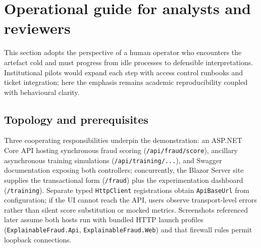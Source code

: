 \begin{table}[htbp]
\centering
{\footnotesize\setlength{\tabcolsep}{4pt}\renewcommand{\arraystretch}{1.08}%
}
\caption{Research questions (RQ1--RQ3) mapped to examiner-visible surfaces.}
\label{tab:rq-ui-traceability}
\end{table}

\section{Operational guide for analysts and reviewers}
\label{sec:operational-guide}
This section adopts the perspective of a human operator who encounters the artefact cold and must progress from idle processes to defensible interpretations. Institutional pilots would expand each step with access control runbooks and ticket integration; here the emphasis remains academic reproducibility coupled with behavioural clarity.

\subsection{Topology and prerequisites}
Three cooperating responsibilities underpin the demonstration: an ASP.NET Core API hosting synchronous fraud scoring (\texttt{/api/\allowbreak fraud/\allowbreak score}), ancillary asynchronous training simulations (\texttt{/api/\allowbreak training/...}), and Swagger documentation exposing both controllers; concurrently, the Blazor Server site supplies the transactional form (\texttt{/fraud}) plus the experimentation dashboard (\texttt{/training}). Separate typed \texttt{HttpClient} registrations obtain \texttt{ApiBaseUrl} from configuration; if the UI cannot reach the API, users observe transport-level errors rather than silent score substitution or mocked metrics. Screenshots referenced later assume both hosts run with bundled HTTP launch profiles (\texttt{Explainable\allowbreak Fraud.Api}, \texttt{Explainable\allowbreak Fraud.Web}) and that firewall rules permit loopback connections.

